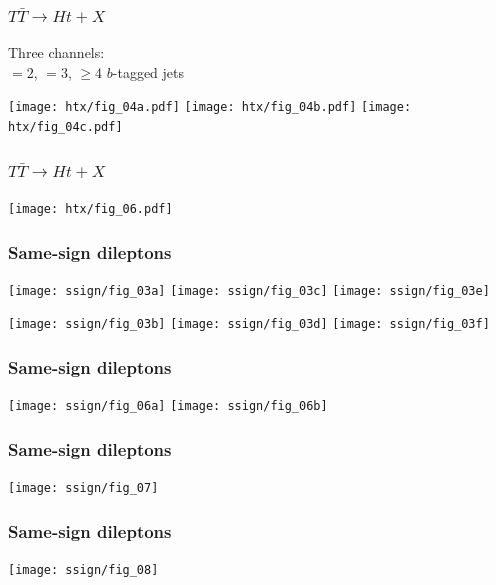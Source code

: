 \documentclass[xcolor=dvipsnames,10pt]{beamer}
\begin{document}
\begin{frame}\frametitle{$T\bar{T}\to Ht+X$~\cite{ATLAS-CONF-2013-018}}
\footnotesize\centering

       Three channels:\\ $=2$, $=3$, \alert{$\geq 4$ $b$-tagged jets}

       \texttt{[image: htx/fig\_04a.pdf]}
       \texttt{[image: htx/fig\_04b.pdf]}
       \texttt{[image: htx/fig\_04c.pdf]}

\end{frame}


\begin{frame}\frametitle{$T\bar{T}\to Ht+X$~\cite{ATLAS-CONF-2013-018}}
\footnotesize\centering

       \texttt{[image: htx/fig\_06.pdf]}

\end{frame}

\begin{frame}\frametitle{Same-sign dileptons~\cite{ATLAS-CONF-2013-051}}
\footnotesize\centering

       \texttt{[image: ssign/fig\_03a]}
       \texttt{[image: ssign/fig\_03c]}
       \texttt{[image: ssign/fig\_03e]}

       \texttt{[image: ssign/fig\_03b]}
       \texttt{[image: ssign/fig\_03d]}
       \texttt{[image: ssign/fig\_03f]}

\end{frame}


\begin{frame}\frametitle{Same-sign dileptons~\cite{ATLAS-CONF-2013-051}}
\footnotesize\centering

       \texttt{[image: ssign/fig\_06a]}
       \texttt{[image: ssign/fig\_06b]}

\end{frame}

\begin{frame}\frametitle{Same-sign dileptons~\cite{ATLAS-CONF-2013-051}}
\footnotesize\centering

       \texttt{[image: ssign/fig\_07]}

\end{frame}

\begin{frame}\frametitle{Same-sign dileptons~\cite{ATLAS-CONF-2013-051}}
\footnotesize\centering

       \texttt{[image: ssign/fig\_08]}

\end{frame}
\end{document}

